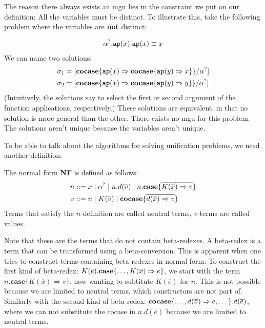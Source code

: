 \documentclass[twoside,12pt,a4paper]{article}
\begin{document}
The reason there always exists an mgu lies in the constraint we put on our definition: All the variables must be distinct. 
To illustrate this, take the following problem where the variables are \textbf{not} distinct:
\begin{example}
    \begin{align*}
        \alpha^?.\texttt{ap}(x).\texttt{ap}(x)\equiv x
    \end{align*}  
    We can name two solutions:
\begin{align*}
    \sigma_1 &= [\textbf{cocase}\{\texttt{ap}(x)\Rightarrow \textbf{cocase}\{\texttt{ap}(y)\Rightarrow x\}\}/\alpha^?]\\
    \sigma_2 &=[\textbf{cocase}\{\texttt{ap}(x)\Rightarrow \textbf{cocase}\{\texttt{ap}(y)\Rightarrow y\}\}/\alpha^?]  
\end{align*}
(Intuitively, the solutions say to select the first or second argument of the function applications, respectively.)
These solutions are equivalent, in that no solution is more general than the other. There exists no mgu for this problem.
The solutions aren't unique because the variables aren't unique.  
\end{example}

To be able to talk about the algorithms for solving unification problems, we need another definition: %
\begin{definition}
    The normal form \textbf{NF} is defined as follows:
    \begin{align*}
        n &::= x \;|\; \alpha^? \;|\; n.d(\overline{v})\;|\; n.\textbf{case}\{\overline{K(\overline{x})\Rightarrow v}\}\\
        v &::= n \;|\; K(\overline{v}) \;|\; \textbf{cocase}\{\overline{d(\overline{x})\Rightarrow v}\}
    \end{align*}
    Terms that satisfy the $n$-definition are called neutral terms, $v$-terms are called values.
\end{definition}
Note that these are the terms that do not contain beta-redexes. 
A beta-redex is a term that can be transformed using a beta-conversion.
This is apparent when one tries to construct terms containing beta-redexes in normal form: 
To construct the first kind of beta-redex: $K(\overline{e}).\textbf{case}\{\dots,K(\overline{x})\Rightarrow e\}$,
we start with the term $n.\textbf{case}\{\overline{K(\overline{x})\Rightarrow v}\}$, now wanting to subtitute $K(\overline{e})$ for $n$. 
This is not possible because we are limited to neutral terms, which constructors are not part of.
Similarly with the second kind of beta-redex:
$\textbf{cocase}\{\dots,d(\overline{x}) \Rightarrow e, \dots\}.d(\overline{e})$, where we can not substitute the cocase in $n.d(\overline{e})$ because we are limited to neutral terms.
        
\end{document}
